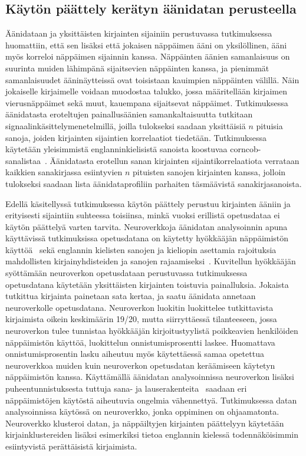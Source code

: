 \documentclass[finnish]{tktltiki2}
\theoremstyle{definition}
\theoremstyle{remark}
\begin{document}
\subsection{Käytön päättely kerätyn äänidatan perusteella}
Äänidataan ja yksittäisten kirjainten sijainiin perustuvassa tutkimuksessa~\cite{berger} huomattiin, että sen lisäksi että jokaisen näppäimen ääni on yksilöllinen, ääni myös korreloi näppäimen sijainnin kanssa. Näppäinten äänien samanlaisuus on suurinta muiden lähimpänä sijaitsevien näppäinten kanssa, ja pienimmät samanlaisuudet ääninäytteissä ovat toisistaan kauimpien näppäinten välillä. Näin jokaiselle kirjaimelle voidaan muodostaa talukko, jossa määritellään kirjaimen vierusnäppäimet sekä muut, kauempana sijaitsevat näppäimet. Tutkimuksessa äänidatasta eroteltujen painallusäänien samankaltaisuutta tutkitaan signaalinkäsittelymenetelmillä, joilla tulokseksi saadaan yksittäisiä $n$ pituisia sanoja, joiden kirjainten sijaintien korrelaatiot tiedetään. Tutkimuksessa käytetään yleisimmistä englanninkielisistä sanoista koostuvaa corncob-sanalistaa~\cite{corn}. Äänidatasta erotellun sanan kirjainten sijaintikorrelaatiota verrataan kaikkien sanakirjassa esiintyvien $n$ pituisten sanojen kirjainten kanssa, jolloin tulokseksi saadaan lista äänidataprofiliin parhaiten täsmäävistä sanakirjasanoista. 

Edellä käsitellyssä tutkimuksessa käytön päättely perustuu kirjainten ääniin ja erityisesti sijaintiin suhteessa toisiinsa, minkä vuoksi erillistä opetusdataa ei käytön päättelyä varten tarvita. Neuroverkkoja äänidatan analysoinnin apuna käyttävissä tutkimuksissa opetusdatana on käytetty hyökkääjän näppäimistön käyttöä~\cite{aso} sekä englannin kielisten sanojen ja kieliopin asettamia rajoituksia mahdollisten kirjainyhdisteiden ja sanojen rajaamiseksi~\cite{zhu}. Kuvitellun hyökkääjän syöttämään neuroverkon opetusdataan perustuvassa tutkimuksessa~\cite{aso} opetusdatana käytetään yksittäisten kirjainten toistuvia painalluksia. Jokaista tutkittua kirjainta painetaan sata kertaa, ja saatu äänidata annetaan neuroverkolle opetusdatana. Neuroverkon luokitin luokittelee tutkittavista kirjaimista oikein keskimäärin 19/20, mutta siirryttäessä tilanteeseen, jossa neuroverkon tulee tunnistaa hyökkääjän kirjoitustyylistä poikkeavien henkilöiden näppäimistön käyttöä, luokittelun onnistumisprosentti laskee. Huomattava onnistumisprosentin lasku aiheutuu myös käytettäessä samaa opetettua neuroverkkoa muiden kuin neuroverkon opetusdatan keräämiseen käytetyn näppäimistön kanssa.
Käyttämällä äänidatan analysoinnissa neuroverkon lisäksi puheentunnistuksesta tuttuja sana- ja lauserakenteita~\cite{zhu} saadaan eri näppäimistöjen käytöstä aiheutuvia ongelmia vähennettyä. Tutkimuksessa datan analysoinnissa käytössä on neuroverkko, jonka oppiminen on ohjaamatonta. Neuroverkko klusteroi datan, ja näppäiltyjen kirjainten päättelyyn käytetään kirjainklustereiden lisäksi esimerkiksi tietoa englannin kielessä todennäköisimmin esiintyvistä perättäisistä kirjaimista.
\end{document}
